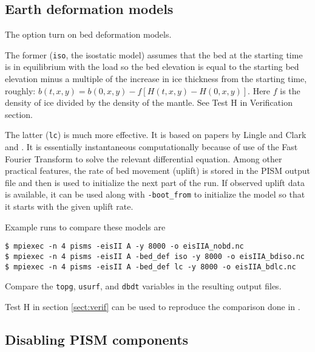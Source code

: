 
\subsection{Earth deformation models} \label{subsect:beddef}  

The option  turn on bed deformation models.

The former (\texttt{iso}, the isostatic model) assumes that the bed at the starting time is in equilibrium with the load so the bed elevation is equal to the starting bed elevation minus a multiple of the increase in ice thickness from the starting time, roughly: $b(t,x,y) = b(0,x,y) - f [H(t,x,y) - H(0,x,y)]$.  Here $f$ is the density of ice divided by the density of the mantle.  See Test H in Verification section. 

The latter (\texttt{lc}) is much more effective.  It is based on papers by Lingle and Clark \cite{LingleClark}  and \cite{BLKfastearth}.  It is essentially instantaneous computationally because of use of the Fast Fourier Transform to solve the relevant differential equation.  Among other practical features, the rate of bed movement (uplift) is stored in the PISM output file and then is used to initialize the next part of the run.  If observed uplift data is available, it can be used along with \texttt{-boot_from} to initialize the model so that it starts with the given uplift rate.

Example runs to compare these models are
\begin{verbatim}
$ mpiexec -n 4 pisms -eisII A -y 8000 -o eisIIA_nobd.nc
$ mpiexec -n 4 pisms -eisII A -bed_def iso -y 8000 -o eisIIA_bdiso.nc
$ mpiexec -n 4 pisms -eisII A -bed_def lc -y 8000 -o eisIIA_bdlc.nc
\end{verbatim}
Compare the \texttt{topg}, \texttt{usurf}, and \texttt{dbdt} variables in the resulting output files.

Test H in section \ref{sect:verif} can be used to reproduce the comparison done in \cite{BLKfastearth}.

\subsection{Disabling PISM components}
\label{sec:turning-off}

